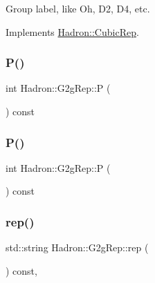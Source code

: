 Group label, like Oh, D2, D4, etc. 

Implements \mbox{\hyperlink{structHadron_1_1CubicRep_a0748f11ec87f387062c8e8981339a29c}{Hadron\+::\+Cubic\+Rep}}.

\mbox{\label{structHadron_1_1G2gRep_a3a822a30667b3675bf639c78289b9ec8}} 
\subsubsection{\texorpdfstring{P()}{P()}\hspace{0.1cm}{\footnotesize\ttfamily [1/2]}}
{\footnotesize\ttfamily int Hadron\+::\+G2g\+Rep\+::P (\begin{DoxyParamCaption}{ }\end{DoxyParamCaption}) const\hspace{0.3cm}{\ttfamily [inline]}}

\mbox{\label{structHadron_1_1G2gRep_a3a822a30667b3675bf639c78289b9ec8}} 
\subsubsection{\texorpdfstring{P()}{P()}\hspace{0.1cm}{\footnotesize\ttfamily [2/2]}}
{\footnotesize\ttfamily int Hadron\+::\+G2g\+Rep\+::P (\begin{DoxyParamCaption}{ }\end{DoxyParamCaption}) const\hspace{0.3cm}{\ttfamily [inline]}}

\mbox{\label{structHadron_1_1G2gRep_a18380ef621e1c6761e5a8b3ff7170f87}} 
\subsubsection{\texorpdfstring{rep()}{rep()}\hspace{0.1cm}{\footnotesize\ttfamily [1/5]}}
{\footnotesize\ttfamily std\+::string Hadron\+::\+G2g\+Rep\+::rep (\begin{DoxyParamCaption}{ }\end{DoxyParamCaption}) const\hspace{0.3cm}{\ttfamily [inline]}, {\ttfamily [virtual]}}



